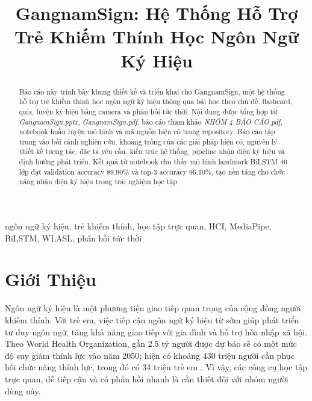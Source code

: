 \documentclass[conference]{IEEEtran}
\begin{document}
\title{GangnamSign: Hệ Thống Hỗ Trợ Trẻ Khiếm Thính Học Ngôn Ngữ Ký Hiệu}

\author{
\and
{}
\and
{}
\and
{}
}

\maketitle

\begin{abstract}
Báo cáo này trình bày khung thiết kế và triển khai cho GangnamSign, một hệ thống hỗ trợ trẻ khiếm thính học ngôn ngữ ký hiệu thông qua bài học theo chủ đề, flashcard, quiz, luyện ký hiệu bằng camera và phản hồi tức thời. Nội dung được tổng hợp từ \textit{GangnamSign.pptx}, \textit{GangnamSign.pdf}, báo cáo tham khảo \textit{NHÓM 4 BÁO CÁO.pdf}, notebook huấn luyện mô hình và mã nguồn hiện có trong repository. Báo cáo tập trung vào bối cảnh nghiên cứu, khoảng trống của các giải pháp hiện có, nguyên lý thiết kế tương tác, đặc tả yêu cầu, kiến trúc hệ thống, pipeline nhận diện ký hiệu và định hướng phát triển. Kết quả từ notebook cho thấy mô hình landmark BiLSTM 46 lớp đạt validation accuracy 89.90\% và top-3 accuracy 96.10\%, tạo nền tảng cho chức năng nhận diện ký hiệu trong trải nghiệm học tập.
\end{abstract}

\begin{IEEEkeywords}
ngôn ngữ ký hiệu, trẻ khiếm thính, học tập trực quan, HCI, MediaPipe, BiLSTM, WLASL, phản hồi tức thời
\end{IEEEkeywords}

\section{Giới Thiệu}
Ngôn ngữ ký hiệu là một phương tiện giao tiếp quan trọng của cộng đồng người khiếm thính. Với trẻ em, việc tiếp cận ngôn ngữ ký hiệu từ sớm giúp phát triển tư duy ngôn ngữ, tăng khả năng giao tiếp với gia đình và hỗ trợ hòa nhập xã hội. Theo World Health Organization, gần 2.5 tỷ người được dự báo sẽ có một mức độ suy giảm thính lực vào năm 2050; hiện có khoảng 430 triệu người cần phục hồi chức năng thính lực, trong đó có 34 triệu trẻ em \cite{who}. Vì vậy, các công cụ học tập trực quan, dễ tiếp cận và có phản hồi nhanh là cần thiết đối với nhóm người dùng này.
\end{document}
